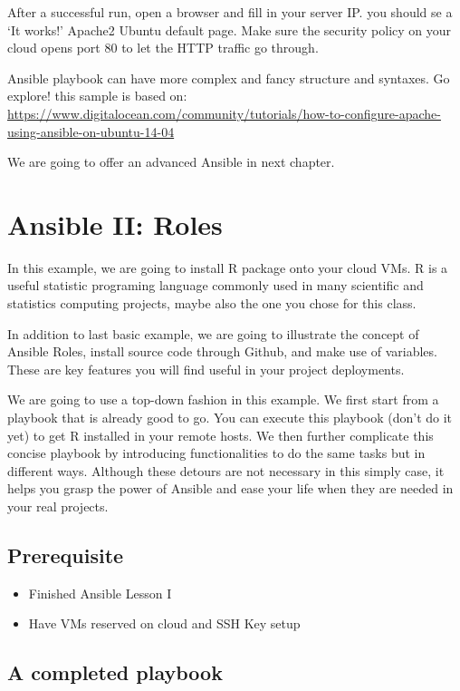 After a successful run, open a browser and fill in your server IP. you
should se a `It works!' Apache2 Ubuntu default page. Make sure the
security policy on your cloud opens port 80 to let the HTTP traffic go
through.

Ansible playbook can have more complex and fancy structure and syntaxes.
Go explore! this sample is based on:
\url{https://www.digitalocean.com/community/tutorials/how-to-configure-apache-using-ansible-on-ubuntu-14-04}

We are going to offer an advanced Ansible in next chapter.
\section{Ansible II: Roles}\label{ansible-ii-roles}

In this example, we are going to install R package onto your cloud VMs.
R is a useful statistic programing language commonly used in many
scientific and statistics computing projects, maybe also the one you
chose for this class.

In addition to last basic example, we are going to illustrate the
concept of Ansible Roles, install source code through Github, and make
use of variables. These are key features you will find useful in your
project deployments.

We are going to use a top-down fashion in this example. We first start
from a playbook that is already good to go. You can execute this
playbook (don't do it yet) to get R installed in your remote hosts. We
then further complicate this concise playbook by introducing
functionalities to do the same tasks but in different ways. Although
these detours are not necessary in this simply case, it helps you grasp
the power of Ansible and ease your life when they are needed in your
real projects.

\subsection{Prerequisite}\label{prerequisite}

\begin{itemize}

\item
  Finished Ansible Lesson I
\item
  Have VMs reserved on cloud and SSH Key setup
\end{itemize}

\subsection{A completed playbook}\label{a-completed-playbook}

